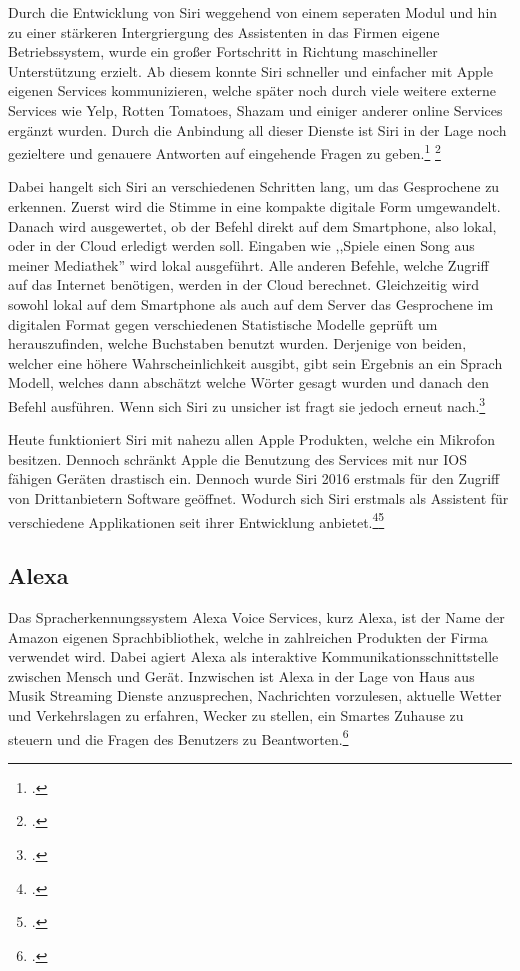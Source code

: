 Durch die Entwicklung von Siri weggehend von einem seperaten Modul und hin zu einer stärkeren Intergriergung des Assistenten in das Firmen eigene Betriebssystem, wurde ein großer Fortschritt in Richtung maschineller Unterstützung erzielt. Ab diesem konnte Siri schneller und einfacher mit Apple eigenen Services kommunizieren, welche später noch durch viele weitere externe Services wie Yelp, Rotten Tomatoes, Shazam und einiger anderer online Services ergänzt wurden. Durch die Anbindung all dieser Dienste ist Siri in der Lage noch gezieltere und genauere Antworten auf eingehende Fragen zu geben.\footcite[vgl.:][]{appleSiri} \footcite[vgl.:][]{Siriexplained} 

Dabei hangelt sich Siri an verschiedenen Schritten lang, um das Gesprochene zu erkennen.
Zuerst wird die Stimme in eine kompakte digitale Form umgewandelt. Danach wird ausgewertet, ob der Befehl direkt auf dem Smartphone, also lokal, oder in der Cloud erledigt werden soll. Eingaben wie ,,Spiele einen Song aus meiner Mediathek'' wird lokal ausgeführt. Alle anderen Befehle, welche Zugriff auf das Internet benötigen, werden in der Cloud berechnet. Gleichzeitig wird sowohl lokal auf dem Smartphone als auch auf dem Server das Gesprochene im digitalen Format gegen verschiedenen Statistische Modelle geprüft um herauszufinden, welche Buchstaben benutzt wurden. Derjenige von beiden, welcher eine höhere Wahrscheinlichkeit ausgibt, gibt sein Ergebnis an ein Sprach Modell, welches dann abschätzt welche Wörter gesagt wurden und danach den Befehl ausführen. Wenn sich Siri zu unsicher ist fragt sie jedoch erneut nach.\footcite[vgl.:][]{howSiriWork}

Heute funktioniert Siri mit nahezu allen Apple Produkten, welche ein Mikrofon besitzen. Dennoch schränkt Apple die Benutzung des Services mit nur IOS fähigen Geräten drastisch ein. Dennoch wurde Siri 2016 erstmals für den Zugriff von Drittanbietern Software geöffnet. Wodurch sich Siri erstmals als Assistent für verschiedene Applikationen seit ihrer Entwicklung anbietet.\footcite[vgl.:][]{appleSiri}\footcite[vgl.:][]{Siriexplained}

\subsection{Alexa}
Das Spracherkennungssystem Alexa Voice Services, kurz Alexa, ist der Name der Amazon eigenen Sprachbibliothek, welche in zahlreichen Produkten der Firma verwendet wird. Dabei agiert Alexa als interaktive Kommunikationsschnittstelle zwischen Mensch und Gerät. Inzwischen ist Alexa in der Lage von Haus aus Musik Streaming Dienste anzusprechen, Nachrichten vorzulesen, aktuelle Wetter und Verkehrslagen zu erfahren, Wecker zu stellen, ein Smartes Zuhause zu steuern und die Fragen des Benutzers zu Beantworten.\footcite[vgl.:][]{alexaExplained}

